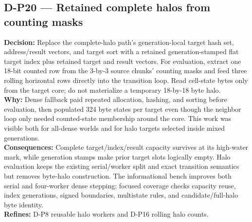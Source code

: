 \subsection*{D-P20 --- Retained complete halos from counting masks}
\begin{decisionbox}[title={D-P20 \quad 2026-08-09}]
\textbf{Decision:} Replace the complete-halo path's generation-local target
hash set, address/result vectors, and target sort with a retained
generation-stamped flat target index plus retained target and result vectors.
For evaluation, extract one 18-bit counted row from the 3-by-3 source chunks'
counting masks and feed three rolling horizontal rows directly into the
transition loop. Read cell-state bytes only from the target core; do not
materialize a temporary 18-by-18 byte halo.\\
\textbf{Why:} Dense fallback paid repeated allocation, hashing, and sorting
before evaluation, then populated 324 byte states per target even though the
neighbor loop only needed counted-state membership around the core. This work
was visible both for all-dense worlds and for halo targets selected inside
mixed generations.\\
\textbf{Consequences:} Complete target/index/result capacity survives at its
high-water mark, while generation stamps make prior target slots logically
empty. Halo evaluation keeps the existing serial/worker split and exact
transition semantics but removes byte-halo construction. The informational
bench improves both serial and four-worker dense stepping; focused coverage
checks capacity reuse, index generations, signed boundaries, multistate rules,
and candidate/full-halo byte identity.\\
\textbf{Refines:} D-P8 reusable halo workers and D-P16 rolling halo counts.
\end{decisionbox}

